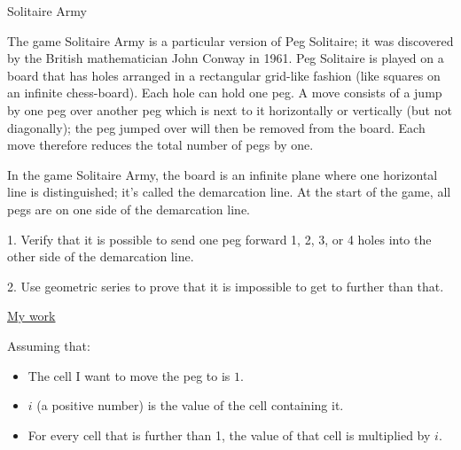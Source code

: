 \documentclass[12pt]{article}
\begin{document}
\begin{center}

{\Large Solitaire Army} 

\end{center}

\vspace*{.2in}


\noindent  The game Solitaire Army is a particular version of Peg Solitaire; it was discovered by the British mathematician John Conway in 1961.   Peg Solitaire is played on a board that has holes arranged in a rectangular grid-like fashion (like squares on an infinite chess-board).  Each hole can hold one peg.  A move consists of a jump by one peg over another peg which is next to it horizontally or vertically (but not diagonally); the peg jumped over will then be removed from the board.  Each move therefore reduces the total number of pegs by one.

In the game Solitaire Army, the board is an infinite plane where one horizontal line is distinguished; it's called the demarcation line.  At the start of the game, all pegs are on one side of the demarcation line.  

1.  Verify that it is possible to send one peg forward 1, 2, 3, or 4 holes into the other side of the demarcation line.  

2.  Use geometric series to prove that it is impossible to get to further than that.  



\newpage

\begin{center}
\underline {\Large {My work} }
\end{center}




Assuming that:
\begin{itemize}
    \item The cell I want to move the peg to is $1$.
    \item $i$ (a positive number) is the value of the cell containing it.
    \item For every cell that is further than 1, the value of that cell is multiplied by $i$.
\end{itemize}
\end{document}
